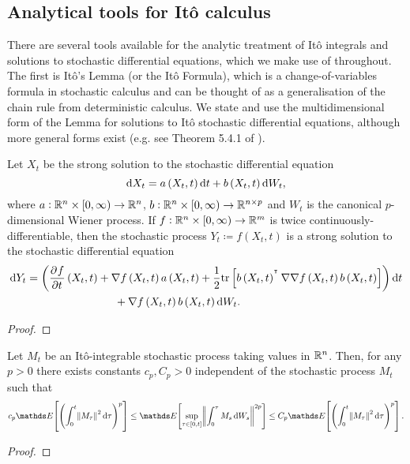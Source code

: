 \subsection{Analytical tools for It\^o calculus}
There are several tools available for the analytic treatment of It\^o integrals and solutions to stochastic differential equations, which we make use of throughout.
The first is It\^o's Lemma (or the It\^o Formula), which is a change-of-variables formula in stochastic calculus and can be thought of as a generalisation of the chain rule from deterministic calculus.
We state and use the multidimensional form of the Lemma for solutions to It\^o stochastic differential equations, although more general forms exist (e.g. see Theorem 5.4.1 of \cite{Bremaud_2020_ProbabilityTheoryStochastic}).
\begin{theorem}[It\^o's Lemma]
	Let \(X_t\) be the strong solution to the stochastic differential equation
	\[
		\dif X_t = a\left(X_t, t\right)\dif t + b\left(X_t, t\right)\dif W_t,
	\]
	where \(a: \mathbb{R}^n \times [0,\infty) \to \mathbb{R}^n\), \(b: \mathbb{R}^n \times [0,\infty) \to \mathbb{R}^{n\times p}\) and \(W_t\) is the canonical \(p\)-dimensional Wiener process.
	If \(f: \mathbb{R}^n \times [0, \infty) \to \mathbb{R}^m\) is twice continuously-differentiable, then the stochastic process \(Y_t \coloneqq f\left(X_t, t\right)\) is a strong solution to the stochastic differential equation
	\begin{align*}
		\dif Y_t & = \left(\dpd{f}{t}\left(X_t, t\right) + \nabla f\left(X_t, t\right) a\left(X_t, t\right) + \frac12\mathrm{tr}\left[b\left(X_t, t\right)^{\T} \nabla\nabla f\left(X_t, t\right) b\left(X_t, t\right)\right] \right)\dif t \\
		         & \qquad\qquad\qquad\qquad + \nabla f\left(X_t, t\right)b\left(X_t, t\right) \dif W_t.
	\end{align*}
\end{theorem}
\begin{proof}

\end{proof}



\begin{theorem}
	Let \(M_t\) be an It\^o-integrable stochastic process taking values in \(\mathbb{R}^n\).
	Then, for any \(p > 0\) there exists constants \(c_p, C_p > 0\) independent of the stochastic process \(M_t\) such that
	\[
		c_p\avg{\left(\int_0^t{\norm{M_\tau}^2\dif \tau}\right)^p} \leq \avg{\sup_{\tau \in \left[0, t\right]}\norm{\int_0^\tau{M_s\dif W_s}}^{2p}} \leq C_p\avg{\left(\int_0^t{\norm{M_\tau}^2\dif \tau}\right)^p}.
	\]
\end{theorem}
\begin{proof}

\end{proof}


